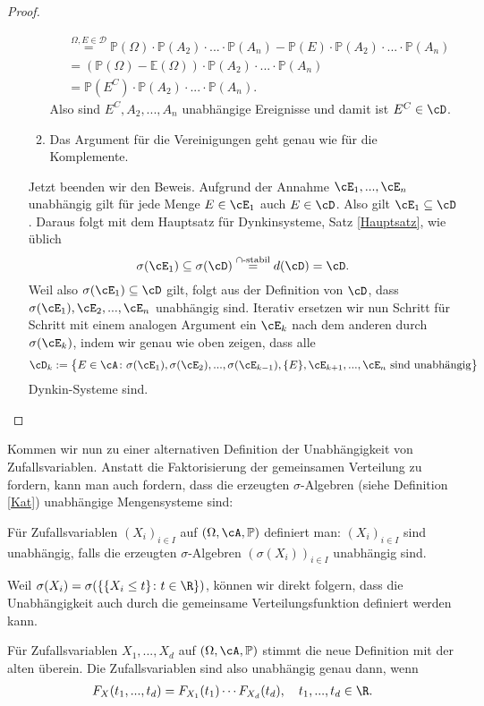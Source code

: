 \begin{proof}
\begin{itemize}
\begin{enumerate}[label=(\roman*)]
\begin{align*}
				&\overset{\Omega, E\in \mathcal D}{=} \mathbb{P}(\Omega) \cdot \mathbb{P}(A_2) \cdot ... \cdot \mathbb{P}(A_n) - \mathbb{P}(E) \cdot \mathbb{P}(A_2) \cdot ... \cdot \mathbb{P}(A_n)\\
				&= (\mathbb{P}(\Omega) - \mathbb{E}(\Omega)) \cdot \mathbb{P}(A_2) \cdot ... \cdot \mathbb{P}(A_n)\\
				&= \mathbb{P}(E^C) \cdot \mathbb{P}(A_2) \cdot ... \cdot \mathbb{P}(A_n).
			\end{align*}
			Also sind $E^C, A_2, ...,A_n$ unabh\"angige Ereignisse und damit ist $E^C\in \cD$.
			\item Das Argument f\"ur die Vereinigungen geht genau wie f\"ur die Komplemente.
		\end{enumerate}
		Jetzt beenden wir den Beweis. Aufgrund der Annahme $\cE_1,...,\cE_n$ unabhängig gilt f\"ur jede Menge $E\in \cE_1$ auch $E\in \cD$. Also gilt $\cE_1\subseteq \cD$. Daraus folgt mit dem Hauptsatz f\"ur Dynkinsysteme, Satz \ref{Hauptsatz}, wie \"ublich
			\[ \sigma(\cE_1) \subseteq \sigma(\cD) \overset{\cap\text{-stabil}}{=} d(\cD) = \cD. \]			
			Weil also $\sigma(\cE_1)\subseteq \cD$ gilt, folgt aus der Definition von $\cD$, dass $\sigma(\cE_1), \cE_2,...,\cE_n$ unabhängig sind. Iterativ ersetzen wir nun Schritt f\"ur Schritt mit einem analogen Argument ein $\cE_k$ nach dem anderen durch $\sigma(\cE_k)$, indem wir genau wie oben zeigen, dass alle 
			\begin{align*}
				\cD_k:= \big\{ E \in \cA \colon \sigma(\cE_1), \sigma(\cE_2),... ,\sigma(\cE_{k-1}),\{E\}, \cE_{k+1}, ..., \cE_n \text{ sind unabhängig} \big\}
			\end{align*}
			Dynkin-Systeme sind.
		\end{itemize}
\end{proof}
Kommen wir nun zu einer alternativen Definition der Unabh\"angigkeit von Zufallsvariablen. Anstatt die Faktorisierung der gemeinsamen Verteilung zu fordern, kann man auch fordern, dass die erzeugten $\sigma$-Algebren (siehe Definition \ref{Kat}) unabh\"angige Mengensysteme sind:
\begin{deff}\label{unab}
	Für Zufallsvariablen $(X_i)_{i \in I}$ auf $(\Omega, \cA, \mathbb{P})$ definiert man: $(X_i)_{i \in I}$ sind unabhängig, falls die erzeugten $\sigma$-Algebren $(\sigma(X_i))_{i \in I}$ unabhängig sind. 
\end{deff}
Weil $\sigma(X_i) = \sigma(\{ \{X_i \leq t \}\colon t \in \R \})$, k\"onnen wir direkt folgern, dass die Unabh\"angigkeit auch durch die gemeinsame Verteilungsfunktion definiert werden kann.
\begin{korollar}
	Für Zufallsvariablen $X_1,...,X_d$ auf $(\Omega, \cA, \mathbb{P})$ stimmt die neue Definition mit der alten überein. Die Zufallsvariablen sind also unabh\"angig genau dann, wenn 
	\begin{align*}
		F_X(t_1,..., t_d)=F_{X_1}(t_1)\cdots F_{X_d}(t_d),\quad t_1,..., t_d\in \R.
	\end{align*}
\end{korollar}

